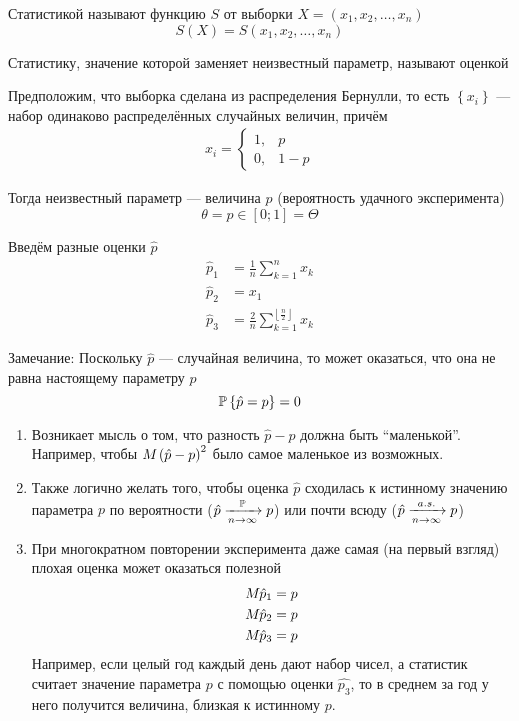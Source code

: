 \begin{definition}[Статистика]
Статистикой называют функцию $S$ от выборки $X=\left(x_1,x_2,\dots,x_n\right)$
    $$S\left(X\right)=S\left(x_1, x_2, \dots, x_n\right)$$
\end{definition}
\begin{definition}[Оценка]Статистику,
    значение которой заменяет неизвестный параметр,
    называют оценкой
\end{definition}
\begin{example}Предположим, что выборка сделана из распределения Бернулли,
    то есть $\left\{x_i\right\}$ --- набор одинаково распределённых
    случайных величин, причём
    \begin{align*}
    x_i=
    \begin{cases}
        1,&p\\
        0,&1-p
    \end{cases}
    \end{align*}

    Тогда неизвестный параметр --- величина $p$
    (вероятность удачного эксперимента)
    $$\theta=p\in\left[0;1\right]=\Theta$$

    Введём разные оценки $\hat{p}$
    \begin{align*}
        \hat{p}_1&=\frac{1}{n}\sum_{k=1}^n x_k\\
        \hat{p}_2&=x_1\\
        \hat{p}_3&=
            \frac{2}{n}\sum_{k=1}^{\left\lfloor \frac{n}{2} \right\rfloor} x_k
    \end{align*}
\end{example}
Замечание:
Поскольку $\hat{p}$ --- случайная величина, то может оказаться,
что она не равна настоящему параметру $p$
$$\mathbb{P}\left\{ \hat{p}=p \right\}=0$$
\begin{enumerate}
    \item Возникает мысль о том, что разность $\hat{p}-p$
        должна быть ``маленькой''. Например, чтобы
        $M_{} \left(\hat{p}-p\right)^2$ было самое маленькое из возможных.
    \item Также логично желать того,
        чтобы оценка $\hat{p}$ сходилась к истинному значению параметра $p$
        по вероятности ($\hat{p}\xrightarrow[n\to\infty]{\mathbb{P}} p$)
        или почти всюду ($\hat{p}\xrightarrow[n\to\infty]{a.s.} p$)
    \item При многократном повторении эксперимента
        даже самая (на первый взгляд) плохая оценка может оказаться полезной
        \begin{align*}
            M_{} \hat{p}_1=p\\
            M_{} \hat{p}_2=p\\
            M_{} \hat{p}_3=p
        \end{align*}
        Например, если целый год каждый день дают набор чисел,
        а статистик считает значение параметра $p$ с помощью оценки $\hat{p_3}$,
        то в среднем за год у него получится величина, близкая к истинному $p$.
\end{enumerate}

